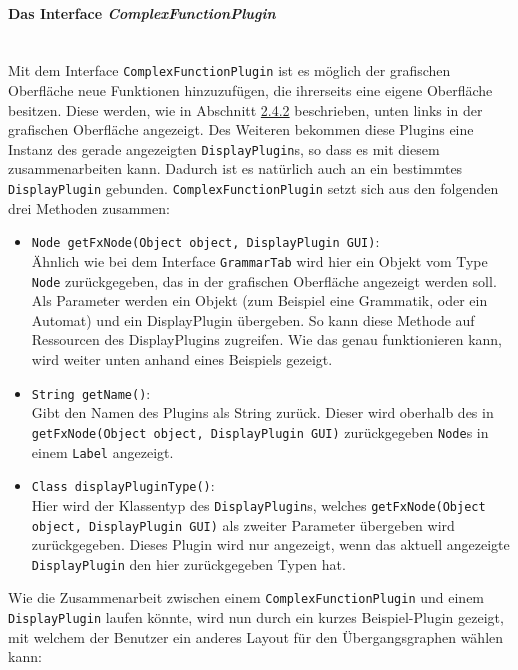 \paragraph{Das Interface \textit{ComplexFunctionPlugin}}\ \\
Mit dem Interface \lstinline[columns=fixed]{ComplexFunctionPlugin} ist es möglich der grafischen Oberfläche neue Funktionen hinzuzufügen, die ihrerseits eine eigene Oberfläche besitzen. Diese werden, wie in Abschnitt \hyperref[sec:2.4.2]{2.4.2} beschrieben, unten links in der grafischen Oberfläche angezeigt. Des Weiteren bekommen diese Plugins eine Instanz des gerade angezeigten \lstinline[columns=fixed]{DisplayPlugin}s, so dass es mit diesem zusammenarbeiten kann. Dadurch ist es natürlich auch an ein bestimmtes \lstinline[columns=fixed]{DisplayPlugin} gebunden. \lstinline[columns=fixed]{ComplexFunctionPlugin} setzt sich aus den folgenden drei Methoden zusammen:
\begin{itemize}
	\item \lstinline[columns=fixed]{Node getFxNode(Object object, DisplayPlugin GUI)}:\\
	Ähnlich wie bei dem Interface \lstinline[columns=fixed]{GrammarTab} wird hier ein Objekt vom Type \lstinline[columns=fixed]{Node} zurückgegeben, das in der grafischen Oberfläche angezeigt werden soll. Als Parameter werden ein Objekt (zum Beispiel eine Grammatik, oder ein Automat) und ein DisplayPlugin übergeben. So kann diese Methode auf Ressourcen des DisplayPlugins zugreifen. Wie das genau funktionieren kann, wird weiter unten anhand eines Beispiels gezeigt.
	\item \lstinline[columns=fixed]{String getName()}:\\
	Gibt den Namen des Plugins als String zurück. Dieser wird oberhalb des in \lstinline[columns=fixed]{getFxNode(Object object, DisplayPlugin GUI)} zurückgegeben \lstinline[columns=fixed]{Node}s in einem \lstinline[columns=fixed]{Label} angezeigt.
	\item \lstinline[columns=fixed]{Class displayPluginType()}:\\
	Hier wird der Klassentyp des \lstinline[columns=fixed]{DisplayPlugin}s, welches \lstinline[columns=fixed]{getFxNode(Object object, DisplayPlugin GUI)} als zweiter Parameter übergeben wird zurückgegeben. Dieses Plugin wird nur angezeigt, wenn das aktuell angezeigte \lstinline[columns=fixed]{DisplayPlugin} den hier zurückgegeben Typen hat.
\end{itemize}
Wie die Zusammenarbeit zwischen einem \lstinline[columns=fixed]{ComplexFunctionPlugin} und einem \lstinline[columns=fixed]{DisplayPlugin} laufen könnte, wird nun durch ein kurzes Beispiel-Plugin gezeigt, mit welchem der Benutzer ein anderes Layout für den Übergangsgraphen wählen kann:
